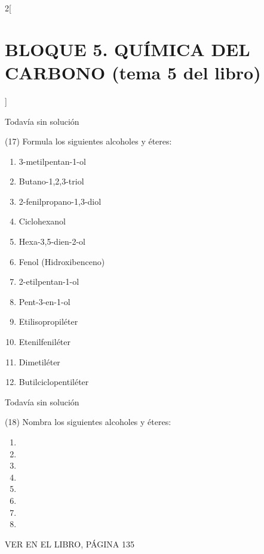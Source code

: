 \documentclass[10pt]{article}
\begin{document}
\begin{multicols}{2}[
  \section{BLOQUE 5. QUÍMICA DEL CARBONO (tema 5 del libro)}
  ]
\begin{solution}[print=false]
  Todavía sin solución
\end{solution}




\begin{exercise}[
    tags    = {},
    topics  = {química, química orgánica, orgánica},
    source  = {FQ 1B MGH 2016, p135, e17},
  ]
  (17) Formula los siguientes alcoholes y éteres:
  \begin{enumerate}
    \item 3-metilpentan-1-ol
    \item Butano-1,2,3-triol
    \item 2-fenilpropano-1,3-diol
    \item Ciclohexanol
    \item Hexa-3,5-dien-2-ol
    \item Fenol (Hidroxibenceno)
    \item 2-etilpentan-1-ol
    \item Pent-3-en-1-ol
    \item Etilisopropiléter
    \item Etenilfeniléter
    \item Dimetiléter
    \item Butilciclopentiléter
  \end{enumerate}
\end{exercise}

\begin{solution}[print=false]
  Todavía sin solución
\end{solution}




\begin{exercise}[
    tags    = {},
    topics  = {química, química orgánica, orgánica},
    source  = {FQ 1B MGH 2016, p135, e18},
  ]
  (18) Nombra los siguientes alcoholes y éteres:
  \begin{enumerate}
    \item {}
    \item {}
    \item {}
    \item {}
    \item {}
    \item {}
    \item {}
    \item {}
  \end{enumerate}
  VER EN EL LIBRO, PÁGINA 135
\end{exercise}


\end{multicols}
\end{document}
